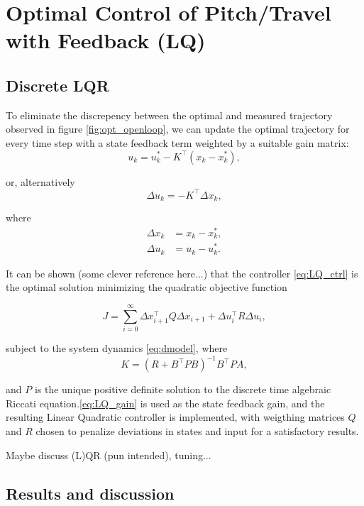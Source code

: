 \section{Optimal Control of Pitch/Travel with Feedback (LQ)}\label{sec:prob3}

\subsection{Discrete LQR}
\label{text:LQR}

To eliminate the discrepency between the optimal and measured trajectory observed in figure \ref{fig:opt_openloop}, we can update the optimal trajectory for every time step with a state feedback term weighted by a suitable gain matrix:
\begin{equation*}
u_k = u_k^* - K^\top(x_k - x_k^*),
\end{equation*}

or, alternatively
\begin{equation}
\label{eq:LQ_ctrl}
\Delta u_k = - K^\top \Delta x_k,
\end{equation}

where 
\begin{align*}
\Delta x_k &= x_k - x_k^*,\\
\Delta u_k &= u_k - u_k^*.
\end{align*}

It can be shown (some clever reference here...) that the controller \eqref{eq:LQ_ctrl} is the optimal solution minimizing the quadratic objective function

\begin{equation*}
	J = \sum_{i=0}^{\infty} \Delta x_{i+1}^\top Q \Delta x_{i+1} + \Delta u_i^\top R \Delta u_i,
\end{equation*}

subject to the system dynamics \eqref{eq:dmodel}, where
\begin{equation}
\label{eq:LQ_gain}
	K = (R + B^\top P B)^{-1} B^\top P A,
\end{equation}

and $P$ is the unique positive definite solution to the discrete time algebraic Riccati equation.\eqref{eq:LQ_gain} is used as the state feedback gain, and the resulting Linear Quadratic controller is implemented, with weigthing matrices $Q$ and $R$ chosen to penalize deviations in states and input for a satisfactory results.

Maybe discuss (L)QR (pun intended), tuning...


\subsection{Results and discussion}

